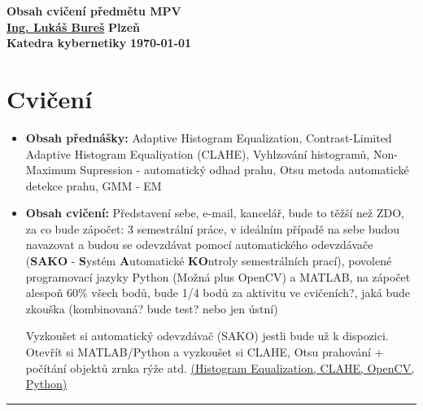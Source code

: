 \documentclass[12pt, a4paper]{article}
\begin{document}
 
\begin{titlepage}
\begin{center}
	\vspace*{\fill}
	\textbf{\Huge{Obsah cvičení předmětu MPV}}\\
	\vspace*{\fill}
	\textbf{\large{\href{mailto:LBures@kky.zcu.cz}{Ing. Lukáš Bureš}}} \hfill \textbf{\large{Plzeň}}\\
	\textbf{\large{Katedra kybernetiky}} \hfill \textbf{\large{\today}}
\end{center}
\end{titlepage}


\setcounter{page}{1}

\tableofcontents
\newpage

\setcounter{page}{1}

\section{Cvičení}
\begin{itemize}
	\item \par{ \textbf{Obsah přednášky:} Adaptive Histogram Equalization, Contrast-Limited Adaptive Histogram Equaliyation (CLAHE), Vyhlzování histogramů, Non-Maximum Supression - automatický odhad prahu, Otsu metoda automatické detekce prahu, GMM - EM}
	\item \par{\textbf{Obsah cvičení:} Představení sebe, e-mail, kancelář, bude to těžší než ZDO, za co bude zápočet: 3 semestrální práce, v ideálním případě na sebe budou navazovat a budou se odevzdávat pomocí automatického odevzdávače (\textbf{SAKO} - \textbf{S}ystém \textbf{A}utomatické \textbf{KO}ntroly semestrálních prací), povolené programovací jazyky Python (Možná plus OpenCV) a MATLAB, na zápočet alespoň 60\% všech bodů, bude 1/4 bodů za aktivitu ve cvičeních?, jaká bude zkouška (kombinovaná? bude test? nebo jen ústní)}
	\par{Vyzkoušet si automatický odevzdávač (SAKO) jestli bude už k dispozici. Otevřít si MATLAB/Python a vyzkoušet si CLAHE, Otsu prahování + počítání objektů zrnka rýže atd. \href{http://docs.opencv.org/master/doc/py_tutorials/py_imgproc/py_histograms/py_histogram_equalization/py_histogram_equalization.html}{(Histogram Equalization, CLAHE, OpenCV, Python)}}
	
\end{itemize}
\noindent\rule[0.5ex]{\linewidth}{0.4pt}
\end{document}
